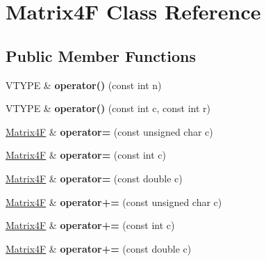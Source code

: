\hypertarget{class_matrix4_f}{\section{Matrix4\+F Class Reference}
\label{class_matrix4_f}
}
\subsection*{Public Member Functions}
\begin{DoxyCompactItemize}
\item 
\hypertarget{class_matrix4_f_a4897c04585e1979e8066e987a9fb3856}{V\+T\+Y\+P\+E \& {\bfseries operator()} (const int n)}\label{class_matrix4_f_a4897c04585e1979e8066e987a9fb3856}

\item 
\hypertarget{class_matrix4_f_a8588453105278757c54a148dc8dce575}{V\+T\+Y\+P\+E \& {\bfseries operator()} (const int c, const int r)}\label{class_matrix4_f_a8588453105278757c54a148dc8dce575}

\item 
\hypertarget{class_matrix4_f_a3b91d1b325c55c49c27b889a55c90ef2}{\hyperlink{class_matrix4_f}{Matrix4\+F} \& {\bfseries operator=} (const unsigned char c)}\label{class_matrix4_f_a3b91d1b325c55c49c27b889a55c90ef2}

\item 
\hypertarget{class_matrix4_f_ad87617d8ac1f70a7aeefafa78fb22154}{\hyperlink{class_matrix4_f}{Matrix4\+F} \& {\bfseries operator=} (const int c)}\label{class_matrix4_f_ad87617d8ac1f70a7aeefafa78fb22154}

\item 
\hypertarget{class_matrix4_f_a2da904d6e155cfb3b82598c318bbe5e5}{\hyperlink{class_matrix4_f}{Matrix4\+F} \& {\bfseries operator=} (const double c)}\label{class_matrix4_f_a2da904d6e155cfb3b82598c318bbe5e5}

\item 
\hypertarget{class_matrix4_f_accced1f7102a8708df602ec1be204082}{\hyperlink{class_matrix4_f}{Matrix4\+F} \& {\bfseries operator+=} (const unsigned char c)}\label{class_matrix4_f_accced1f7102a8708df602ec1be204082}

\item 
\hypertarget{class_matrix4_f_a8dd8a98c0c125f1304122fc66bbc85c1}{\hyperlink{class_matrix4_f}{Matrix4\+F} \& {\bfseries operator+=} (const int c)}\label{class_matrix4_f_a8dd8a98c0c125f1304122fc66bbc85c1}

\item 
\hypertarget{class_matrix4_f_ad75ea9f919a647106ca2411b5fdf0512}{\hyperlink{class_matrix4_f}{Matrix4\+F} \& {\bfseries operator+=} (const double c)}\label{class_matrix4_f_ad75ea9f919a647106ca2411b5fdf0512}


\end{DoxyCompactItemize}
